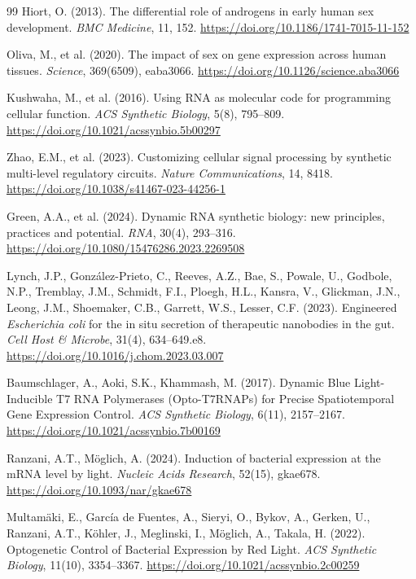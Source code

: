 \documentclass[12pt]{article}
\begin{document}
\begin{thebibliography}{99}
Hiort, O. (2013).
The differential role of androgens in early human sex development.
\textit{BMC Medicine}, 11, 152.
\url{https://doi.org/10.1186/1741-7015-11-152}

Oliva, M., et al. (2020).
The impact of sex on gene expression across human tissues.
\textit{Science}, 369(6509), eaba3066.
\url{https://doi.org/10.1126/science.aba3066}

Kushwaha, M., et al. (2016).
Using RNA as molecular code for programming cellular function.
\textit{ACS Synthetic Biology}, 5(8), 795--809.
\url{https://doi.org/10.1021/acssynbio.5b00297}

Zhao, E.M., et al. (2023).
Customizing cellular signal processing by synthetic multi-level regulatory circuits.
\textit{Nature Communications}, 14, 8418.
\url{https://doi.org/10.1038/s41467-023-44256-1}

Green, A.A., et al. (2024).
Dynamic RNA synthetic biology: new principles, practices and potential.
\textit{RNA}, 30(4), 293--316.
\url{https://doi.org/10.1080/15476286.2023.2269508}

Lynch, J.P., Gonz\'{a}lez-Prieto, C., Reeves, A.Z., Bae, S., Powale, U., Godbole, N.P., Tremblay, J.M., Schmidt, F.I., Ploegh, H.L., Kansra, V., Glickman, J.N., Leong, J.M., Shoemaker, C.B., Garrett, W.S., Lesser, C.F. (2023).
Engineered \textit{Escherichia coli} for the in situ secretion of therapeutic nanobodies in the gut.
\textit{Cell Host \& Microbe}, 31(4), 634--649.e8.
\url{https://doi.org/10.1016/j.chom.2023.03.007}

Baumschlager, A., Aoki, S.K., Khammash, M. (2017).
Dynamic Blue Light-Inducible T7 RNA Polymerases (Opto-T7RNAPs) for Precise Spatiotemporal Gene Expression Control.
\textit{ACS Synthetic Biology}, 6(11), 2157--2167.
\url{https://doi.org/10.1021/acssynbio.7b00169}

Ranzani, A.T., M\"{o}glich, A. (2024).
Induction of bacterial expression at the mRNA level by light.
\textit{Nucleic Acids Research}, 52(15), gkae678.
\url{https://doi.org/10.1093/nar/gkae678}

Multam\"{a}ki, E., Garc\'{i}a de Fuentes, A., Sieryi, O., Bykov, A., Gerken, U., Ranzani, A.T., K\"{o}hler, J., Meglinski, I., M\"{o}glich, A., Takala, H. (2022).
Optogenetic Control of Bacterial Expression by Red Light.
\textit{ACS Synthetic Biology}, 11(10), 3354--3367.
\url{https://doi.org/10.1021/acssynbio.2c00259}


\end{thebibliography}
\end{document}
